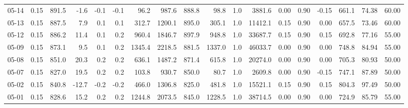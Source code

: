 \begin{threeparttable}
{\begin{tabular}{lrrrrrrrrrrrrrrrrr}
  05-14 &     0.15 & 891.5 &              -1.6 &              -0.1 &               -0.1 &               96.2 &   987.6 & 888.8 &       98.8 &                      1.0 &              3881.6 &       0.00 &      0.90 &          -0.15 &            661.1 &           74.38 &                  60.00 \\
  05-13 &     0.15 & 887.5 &               7.9 &               0.1 &                0.1 &              312.7 &  1200.1 & 895.0 &      305.1 &                      1.0 &             11412.1 &       0.15 &      0.90 &           0.00 &            657.5 &           73.46 &                  60.00 \\
  05-12 &     0.15 & 886.2 &              11.4 &               0.1 &                0.2 &              960.4 &  1846.7 & 897.9 &      948.8 &                      1.0 &             33687.7 &       0.15 &      0.90 &           0.15 &            692.8 &           77.16 &                  55.00 \\
  05-09 &     0.15 & 873.1 &               9.5 &               0.1 &                0.2 &             1345.4 &  2218.5 & 881.5 &     1337.0 &                      1.0 &             46033.7 &       0.00 &      0.90 &           0.00 &            748.8 &           84.94 &                  55.00 \\
  05-08 &     0.15 & 851.0 &              20.3 &               0.2 &                0.2 &              636.1 &  1487.2 & 871.4 &      615.8 &                      1.0 &             20274.0 &       0.00 &      0.90 &           0.00 &            705.3 &           80.93 &                  50.00 \\
  05-07 &     0.15 & 827.0 &              19.5 &               0.2 &                0.2 &              103.8 &   930.7 & 850.0 &       80.7 &                      1.0 &              2609.8 &       0.00 &      0.90 &          -0.15 &            747.1 &           87.89 &                  50.00 \\
  05-02 &     0.15 & 840.8 &             -12.7 &              -0.2 &               -0.2 &              466.0 &  1306.8 & 825.0 &      481.8 &                      1.0 &             15521.1 &       0.15 &      0.90 &           0.15 &            804.3 &           97.49 &                  50.00 \\
  05-01 &     0.15 & 828.6 &              15.2 &               0.2 &                0.2 &             1244.8 &  2073.5 & 845.0 &     1228.5 &                      1.0 &             38714.5 &       0.00 &      0.90 &           0.00 &            724.9 &           85.79 &                  55.00 \\

\end{tabular}}
\end{threeparttable}
